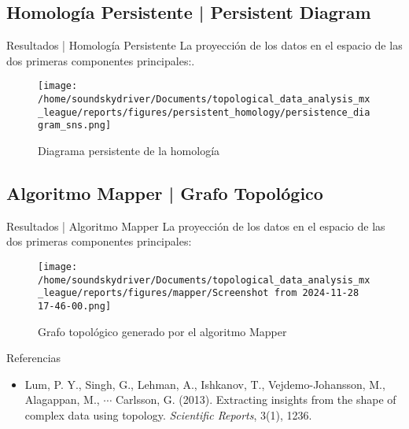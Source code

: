 \documentclass[11pt]{beamer}
\begin{document}
        \subsection{Homología Persistente | Persistent Diagram}
        \begin{frame}{Resultados | Homología Persistente}
			\justifying
            La proyección de los datos en el espacio de las dos primeras componentes principales:.
            \begin{figure}[H]
				\centering
				\texttt{[image: /home/soundskydriver/Documents/topological\_data\_analysis\_mx\_league/reports/figures/persistent\_homology/persistence\_diagram\_sns.png]}
				\caption{Diagrama persistente de la homología}
                \label{fig: Figura5}
			\end{figure}
        \end{frame}
        \subsection{Algoritmo Mapper | Grafo Topológico}
        \begin{frame}{Resultados | Algoritmo Mapper}
            \justifying
            La proyección de los datos en el espacio de las dos primeras componentes principales:
            \begin{figure}[H]
                \centering
                \texttt{[image: /home/soundskydriver/Documents/topological\_data\_analysis\_mx\_league/reports/figures/mapper/Screenshot from 2024-11-28 17-46-00.png]}
                \caption{Grafo topológico generado por el algoritmo Mapper}
                \label{fig: Figura6}
            \end{figure}
        \end{frame}

	


\appendix

\begin{frame}{Referencias}
    \begin{itemize}
        \item Lum, P. Y., Singh, G., Lehman, A., Ishkanov, T., Vejdemo-Johansson, M., Alagappan, M., $\cdots$ Carlsson, G. (2013). Extracting insights from the shape of complex data using topology. \textit{Scientific Reports}, 3(1), 1236.
    \end{itemize}
\end{frame}
\end{document}
